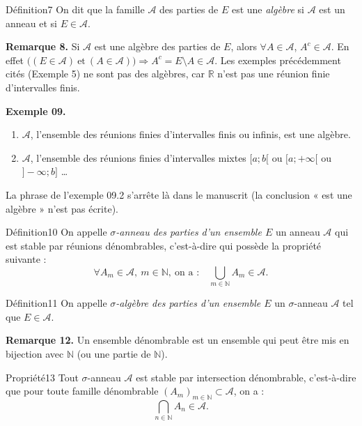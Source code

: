 \documentclass[11pt,a4paper]{article}
\newcommand{\R}{\mathbb{R}}
\newcommand{\N}{\mathbb{N}}
\newcommand{\A}{\mathscr{A}}
\begin{document}
\begin{enonce}{Définition}{7}
On dit que la famille $\A$ des parties de $E$ est une \emph{algèbre} si $\A$ est un anneau et si $E\in\A$.
\end{enonce}

\textbf{\color{bleu}Remarque 8.}
Si $\A$ est une algèbre des parties de $E$, alors $\forall A\in\A$, $A^{c}\in\A$.
En effet $\bigl((E\in\A)\ \text{et}\ (A\in\A)\bigr)\Rightarrow A^{c}=E\setminus A\in\A$.
Les exemples précédemment cités (Exemple 5) ne sont pas des algèbres, car $\R$ n'est pas une réunion finie
d'intervalles finis.

\textbf{\color{bleu}Exemple 09.}
\begin{enumerate}[label=\textbf{\arabic*-},leftmargin=1.2cm]
  \item $\A$, l'ensemble des réunions finies d'intervalles finis ou infinis, est une algèbre.
  \item $\A$, l'ensemble des réunions finies d'intervalles mixtes $[a;b[$ ou $[a;+\infty[$ ou $]-\infty;b]$
        \ldots
\end{enumerate}

\begin{note}
La phrase de l'exemple 09.2 s'arrête là dans le manuscrit (la conclusion « est une algèbre » n'est pas écrite).
\end{note}

\begin{enonce}{Définition}{10}
On appelle \emph{$\sigma$-anneau des parties d'un ensemble $E$} un anneau $\A$ qui est stable par réunions
dénombrables, c'est-à-dire qui possède la propriété suivante :
\[
  \forall A_m\in\A,\ m\in\N,\ \text{on a :}\quad \bigcup_{m\in\N}A_m\in\A .
\]
\end{enonce}

\begin{enonce}{Définition}{11}
On appelle \emph{$\sigma$-algèbre des parties d'un ensemble $E$} un $\sigma$-anneau $\A$ tel que $E\in\A$.
\end{enonce}

\textbf{\color{bleu}Remarque 12.}
Un ensemble dénombrable est un ensemble qui peut être mis en bijection avec $\N$ (ou une partie de $\N$).

\begin{enonce}{Propriété}{13}
Tout $\sigma$-anneau $\A$ est stable par intersection dénombrable, c'est-à-dire que pour toute famille
dénombrable $(A_m)_{m\in\N}\subset\A$, on a :
\[
  \bigcap_{n\in\N}A_n\in\A .
\]
\end{enonce}
\end{document}
